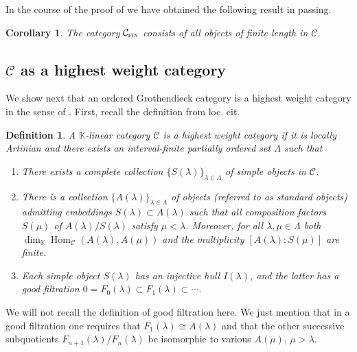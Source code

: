 \documentclass[11pt]{article}
\theoremstyle{plain}
\newtheorem{corollary}[lemma]{Corollary}
\theoremstyle{nonumberplain}
\theoremstyle{plain}
\newtheorem{definition}[lemma]{Definition}
\theoremstyle{nonumberplain}
\newtheorem{proof}{Proof}
\newcommand\bK{{\mathbb K}}
\newcommand\cC{{\mathcal C}}
\newcommand\cM{{\mathcal M}}
\DeclareMathOperator{\Hom}{\mathrm{Hom}}
\DeclareMathOperator{\fin}{\cat{fin}}
\newcommand{\cat}[1]{\textsc{#1}}
\begin{document}
 In the course of the proof of  we have obtained the following result in passing. 



\begin{corollary}
	The category $\mathcal{C}_{\fin}$ consists of all objects of finite length in $\mathcal{C}$.
\end{corollary}








\subsection{$\cC$ as a highest weight category}
\label{subse.hw}



We show next that an ordered Grothendieck category is a highest weight category in the sense of \cite[Definition 3.1]{CPS}.   First, recall the definition from loc. cit.



\begin{definition}\label{def.hw}
  A $\bK$-linear category $\cC$ is a {\it highest weight category} if it is locally Artinian and there exists an interval-finite partially ordered set $\Lambda$ such that
\renewcommand{\labelenumi}{(\arabic{enumi})}
  \begin{enumerate}
    \item There exists a complete collection $\{S(\lambda)\}_{\lambda\in \Lambda}$ of simple objects in $\cC$.
    \item There is a collection $\{A(\lambda)\}_{\lambda\in \Lambda}$ of objects (referred to as {\it standard objects}) admitting embeddings $S(\lambda)\subset A(\lambda)$ such that all composition factors $S(\mu)$ of $A(\lambda)/S(\lambda)$ satisfy $\mu<\lambda$. Moreover, for all $\lambda,\mu\in \Lambda$ both $\dim_\bK\Hom_\cC(A(\lambda),A(\mu))$ and the multiplicity $[A(\lambda):S(\mu)]$ are finite. 
    \item Each simple object $S(\lambda)$ has an injective hull $I(\lambda)$, and the latter has a good filtration $0=F_0(\lambda)\subset F_1(\lambda)\subset\cdots$.
  \end{enumerate}
\end{definition}
We will not recall the definition of good filtration here.  We just mention that in a good filtration one requires that $F_1(\lambda)\cong A(\lambda)$ and that the other successive subquotients $F_{n+1}(\lambda)/F_n(\lambda)$ be isomorphic to various $A(\mu)$, $\mu>\lambda$. 
\end{document}
